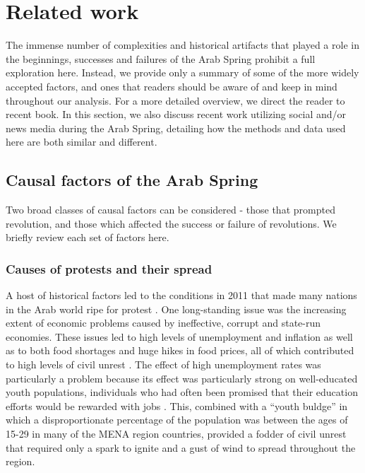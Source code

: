 \section{Related work}

The immense number of complexities and historical artifacts that played a role in the beginnings, successes and failures of the Arab Spring prohibit a full exploration here.  Instead, we provide only a summary of some of the more widely accepted factors, and ones that readers should be aware of and keep in mind throughout our analysis. For a more detailed overview, we direct the reader to  recent book. In this section, we also discuss recent work utilizing social and/or news media during the Arab Spring, detailing how the methods and data used here are both similar and different.  

\subsection{Causal factors of the Arab Spring}

Two broad classes of causal factors can be considered - those that prompted revolution, and those which affected the success or failure of revolutions.  We briefly review each set of factors here.

\subsubsection{Causes of protests and their spread}

A host of historical factors led to the conditions in 2011 that made many nations in the Arab world ripe for protest \cite{gelvin_arab_2015}. One long-standing issue was the increasing extent of economic problems caused by ineffective, corrupt and state-run economies.  These issues led to high levels of unemployment and inflation \cite{dewey_impact_2012} as well as to both food shortages and huge hikes in food prices, all of which contributed to high levels of civil unrest \cite{goldstone_cross-class_2011,comunello_will_2012}.  The effect of high unemployment rates was particularly a problem because its effect was particularly strong on well-educated youth populations, individuals who had often been promised that their education efforts would be rewarded with jobs \cite{dewey_impact_2012,gelvin_arab_2015}. This, combined with a ``youth buldge'' in which a disproportionate percentage of the population was  between the ages of 15-29 in many of the MENA region countries, provided a fodder of civil unrest that required only a spark to ignite and a gust of wind to spread throughout the region.

